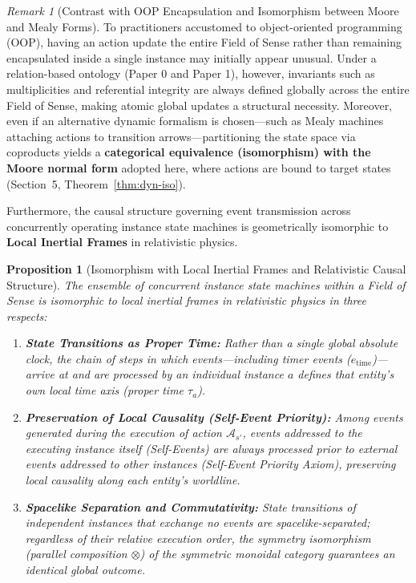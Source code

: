 \documentclass[11pt,a4paper]{article}
\theoremstyle{definition}
\theoremstyle{plain}
\newtheorem{proposition}{Proposition}[section]
\theoremstyle{remark}
\newtheorem{remark}{Remark}[section]
\begin{document}
\begin{remark}[Contrast with OOP Encapsulation and Isomorphism between Moore and Mealy Forms]\label{rem:moore-mealy}
To practitioners accustomed to object-oriented programming (OOP), having an action update the entire Field of Sense rather than remaining encapsulated inside a single instance may initially appear unusual. Under a relation-based ontology (Paper 0 and Paper 1), however, invariants such as multiplicities and referential integrity are always defined globally across the entire Field of Sense, making atomic global updates a structural necessity. Moreover, even if an alternative dynamic formalism is chosen---such as Mealy machines attaching actions to transition arrows---partitioning the state space via coproducts yields a \textbf{categorical equivalence (isomorphism) with the Moore normal form} adopted here, where actions are bound to target states (Section~5, Theorem~\ref{thm:dyn-iso}).
\end{remark}

Furthermore, the causal structure governing event transmission across concurrently operating instance state machines is geometrically isomorphic to \textbf{Local Inertial Frames} in relativistic physics.

\begin{proposition}[Isomorphism with Local Inertial Frames and Relativistic Causal Structure]\label{prop:inertial-frame}
The ensemble of concurrent instance state machines within a Field of Sense is isomorphic to local inertial frames in relativistic physics in three respects:
\begin{enumerate}
    \item \textbf{State Transitions as Proper Time:} Rather than a single global absolute clock, the chain of steps in which events---including timer events ($e_{\mathrm{time}}$)---arrive at and are processed by an individual instance $a$ defines that entity's own local time axis (proper time $\tau_a$).
    \item \textbf{Preservation of Local Causality (Self-Event Priority):} Among events generated during the execution of action $\mathcal{A}_{s'}$, events addressed to the executing instance itself (Self-Events) are always processed prior to external events addressed to other instances (Self-Event Priority Axiom), preserving local causality along each entity's worldline.
    \item \textbf{Spacelike Separation and Commutativity:} State transitions of independent instances that exchange no events are spacelike-separated; regardless of their relative execution order, the symmetry isomorphism (parallel composition $\otimes$) of the symmetric monoidal category guarantees an identical global outcome.
\end{enumerate}
\end{proposition}
\end{document}
